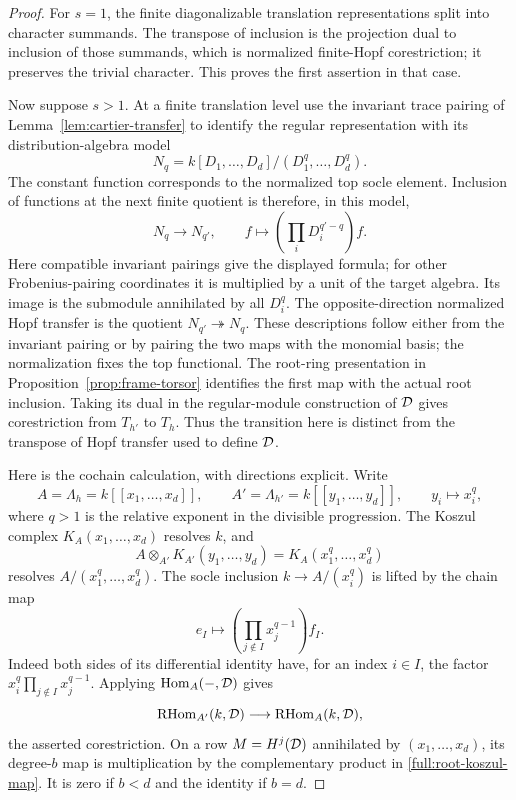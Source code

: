 \begin{proof}
For $s=1$, the finite diagonalizable translation representations
split into character summands.  The transpose of inclusion is the
projection dual to inclusion of those summands, which is normalized
finite-Hopf corestriction; it preserves the trivial character.
This proves the first assertion in that case.

Now suppose $s>1$.  At a finite translation level use the
invariant trace pairing of
Lemma~\ref{lem:cartier-transfer} to identify the regular
representation with its distribution-algebra model
\[
 N_q=k[D_1,\ldots,D_d]/(D_1^q,\ldots,D_d^q).
\]
The constant function corresponds to the normalized top socle
element.  Inclusion of functions at the next finite quotient is
therefore, in this model,
\[
 N_q\longrightarrow N_{q'},\qquad
 f\longmapsto
       \left(\prod_iD_i^{q'-q}\right)f .
\]
Here compatible invariant pairings give the displayed formula;
for other Frobenius-pairing coordinates it is multiplied by
a unit of the target algebra.
Its image is the submodule annihilated by all $D_i^q$.
The opposite-direction normalized Hopf transfer is the quotient
$N_{q'}\twoheadrightarrow N_q$.
These descriptions follow either from the invariant pairing or
by pairing the two maps with the monomial basis; the normalization
fixes the top functional.  The root-ring presentation in
Proposition~\ref{prop:frame-torsor} identifies the first map with
the actual root inclusion.  Taking its dual in the regular-module
construction of $\mathcal D$ gives corestriction from $T_{h'}$ to $T_h$.
Thus the transition here is distinct from the transpose of Hopf
transfer used to define $\mathcal D$.

Here is the cochain calculation, with directions explicit.
Write
\[
 A=\Lambda_h=k[[x_1,\ldots,x_d]],\qquad
 A'=\Lambda_{h'}=k[[y_1,\ldots,y_d]],\qquad
 y_i\longmapsto x_i^q ,
\]
where $q>1$ is the relative exponent in the divisible progression.
The Koszul complex $K_A(x_1,\ldots,x_d)$ resolves $k$, and
\[
 A\otimes_{A'}K_{A'}(y_1,\ldots,y_d)
       =K_A(x_1^q,\ldots,x_d^q)
\]
resolves $A/(x_1^q,\ldots,x_d^q)$.
The socle inclusion $k\to A/(x_i^q)$ is lifted by the chain map
\begin{equation}
\label{full:root-koszul-map}
 e_I\longmapsto
       \left(\prod_{j\notin I}x_j^{q-1}\right)f_I .
\end{equation}
Indeed both sides of its differential identity have, for an
index $i\in I$, the factor
$x_i^q\prod_{j\notin I}x_j^{q-1}$.
Applying $\operatorname{Hom}_A(-,\mathcal D)$ gives
\[
 \operatorname{RHom}_{A'}(k,\mathcal D)\longrightarrow\operatorname{RHom}_A(k,\mathcal D),
\]
the asserted corestriction.  On a row $M=H^j(\mathcal D)$ annihilated
by $(x_1,\ldots,x_d)$, its degree-$b$ map is multiplication by
the complementary product in \eqref{full:root-koszul-map}.
It is zero if $b<d$ and the identity if $b=d$.


\end{proof}
